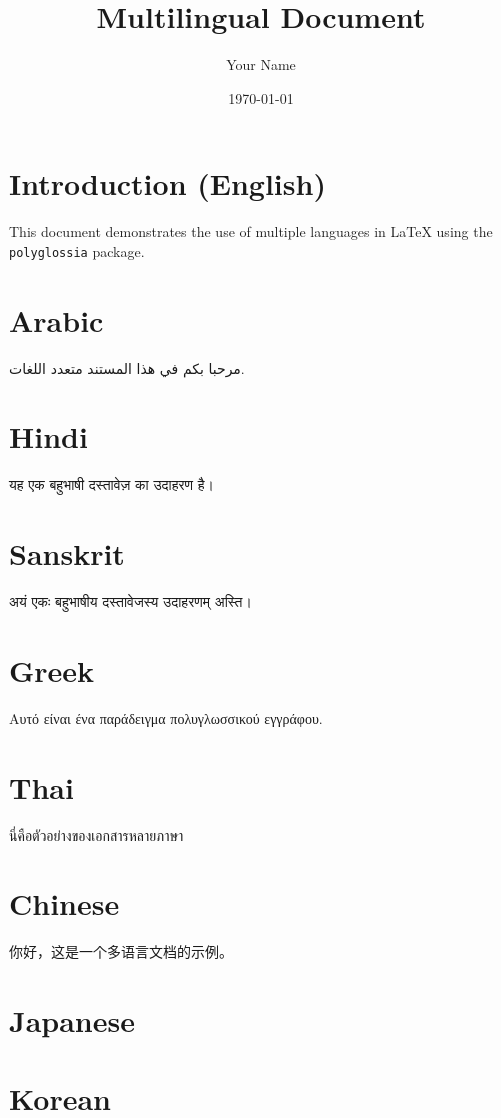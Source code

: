 \documentclass{scrartcl}
\begin{document}
\title{Multilingual Document}
\author{Your Name}
\date{\today}
\maketitle

\section{Introduction (English)}
This document demonstrates the use of multiple languages in LaTeX using the \texttt{polyglossia} package.

\section{Arabic}
\begin{arabic}
مرحبا بكم في هذا المستند متعدد اللغات.
\end{arabic}

\section{Hindi}
\begin{devanagari}
यह एक बहुभाषी दस्तावेज़ का उदाहरण है।
\end{devanagari}

\section{Sanskrit}
\begin{sanskrit}
अयं एकः बहुभाषीय दस्तावेजस्य उदाहरणम् अस्ति।
\end{sanskrit}

\section{Greek}
\textgreek{Αυτό είναι ένα παράδειγμα πολυγλωσσικού εγγράφου.}

\section{Thai}
\begin{thaifont}
นี่คือตัวอย่างของเอกสารหลายภาษา
\end{thaifont}

\section{Chinese}
你好，这是一个多语言文档的示例。

\section{Japanese}

\section{Korean}
\end{document}
